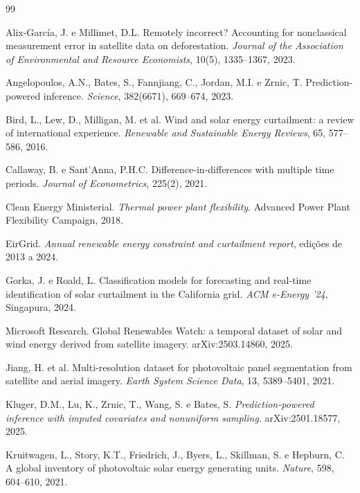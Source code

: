 \backmatter
\twocolumn
\begin{thebibliography}{99}
\footnotesize

 Alix-García, J. e Millimet, D.L. Remotely incorrect?
  Accounting for nonclassical measurement error in satellite data on
  deforestation. \emph{Journal of the Association of Environmental and Resource
  Economists}, 10(5), 1335--1367, 2023.

 Angelopoulos, A.N., Bates, S., Fannjiang, C.,
  Jordan, M.I. e Zrnic, T. Prediction-powered inference. \emph{Science},
  382(6671), 669--674, 2023.

 Bird, L., Lew, D., Milligan, M. et al. Wind and solar energy
  curtailment: a review of international experience. \emph{Renewable and
  Sustainable Energy Reviews}, 65, 577--586, 2016.

 Callaway, B. e Sant'Anna, P.H.C. Difference-in-differences
  with multiple time periods. \emph{Journal of Econometrics}, 225(2), 2021.

 Clean Energy Ministerial. \emph{Thermal power plant
  flexibility}. Advanced Power Plant Flexibility Campaign, 2018.

 EirGrid. \emph{Annual renewable energy constraint and
  curtailment report}, edições de 2013 a 2024.

 Gorka, J. e Roald, L. Classification models for
  forecasting and real-time identification of solar curtailment in the
  California grid. \emph{ACM e-Energy '24}, Singapura, 2024.

 Microsoft Research. Global Renewables Watch: a temporal
  dataset of solar and wind energy derived from satellite imagery.
  arXiv:2503.14860, 2025.

 Jiang, H. et al. Multi-resolution dataset for photovoltaic
  panel segmentation from satellite and aerial imagery. \emph{Earth System
  Science Data}, 13, 5389--5401, 2021.

 Kluger, D.M., Lu, K., Zrnic, T., Wang, S. e Bates, S.
  \emph{Prediction-powered inference with imputed covariates and nonuniform
  sampling}. arXiv:2501.18577, 2025.

 Kruitwagen, L., Story, K.T., Friedrich, J., Byers, L.,
  Skillman, S. e Hepburn, C. A global inventory of photovoltaic solar energy
  generating units. \emph{Nature}, 598, 604--610, 2021.


\end{thebibliography}
